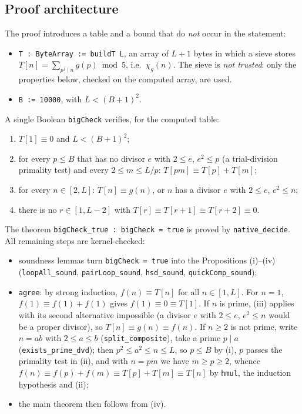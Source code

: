\documentclass[11pt]{article}
\numberwithin{equation}{section}
\theoremstyle{definition}
\theoremstyle{remark}
\begin{document}
\subsection{Proof architecture}
The proof introduces a table and a bound that do \emph{not} occur in the statement:
\begin{itemize}
\item \texttt{T : ByteArray := buildT L}, an array of $L+1$ bytes in which a sieve stores
$T[n]=\sum_{p^j\mid n}g(p)\bmod 5$, i.e.\ $\chi_{g}(n)$. The sieve is \emph{not trusted}: only the
properties below, checked on the computed array, are used.
\item \texttt{B := 10000}, with $L<(B+1)^2$.
\end{itemize}
A single Boolean \texttt{bigCheck} verifies, for the computed table:
\begin{enumerate}
\item[(i)] $T[1]\equiv0$ and $L<(B+1)^2$;
\item[(ii)] for every $p\le B$ that has no divisor $e$ with $2\le e$, $e^2\le p$ (a trial-division
primality test) and every $2\le m\le L/p$: $T[pm]\equiv T[p]+T[m]$;
\item[(iii)] for every $n\in[2,L]$: $T[n]\equiv g(n)$, or $n$ has a divisor $e$ with $2\le e$, $e^2\le n$;
\item[(iv)] there is no $r\in[1,L-2]$ with $T[r]\equiv T[r+1]\equiv T[r+2]\equiv0$.
\end{enumerate}
The theorem \texttt{bigCheck\_true : bigCheck = true} is proved by \texttt{native\_decide}. All remaining
steps are kernel-checked:
\begin{itemize}
\item soundness lemmas turn \texttt{bigCheck = true} into the Propositions (i)--(iv)
(\texttt{loopAll\_sound}, \texttt{pairLoop\_sound}, \texttt{hsd\_sound}, \texttt{quickComp\_sound});
\item \texttt{agree}: by strong induction, $f(n)\equiv T[n]$ for all $n\in[1,L]$. For $n=1$,
$f(1)\equiv f(1)+f(1)$ gives $f(1)\equiv0\equiv T[1]$. If $n$ is prime, (iii) applies with its second
alternative impossible (a divisor $e$ with $2\le e$, $e^2\le n$ would be a proper divisor), so
$T[n]\equiv g(n)\equiv f(n)$. If $n\ge2$ is not prime, write $n=ab$ with $2\le a\le b$
(\texttt{split\_composite}), take a prime $p\mid a$ (\texttt{exists\_prime\_dvd}); then $p^2\le a^2\le n\le L$,
so $p\le B$ by (i), $p$ passes the primality test in (ii), and with $n=pm$ we have $m\ge p\ge2$, whence
$f(n)\equiv f(p)+f(m)\equiv T[p]+T[m]\equiv T[n]$ by \texttt{hmul}, the induction hypothesis and (ii);
\item the main theorem then follows from (iv).
\end{itemize}
\end{document}
